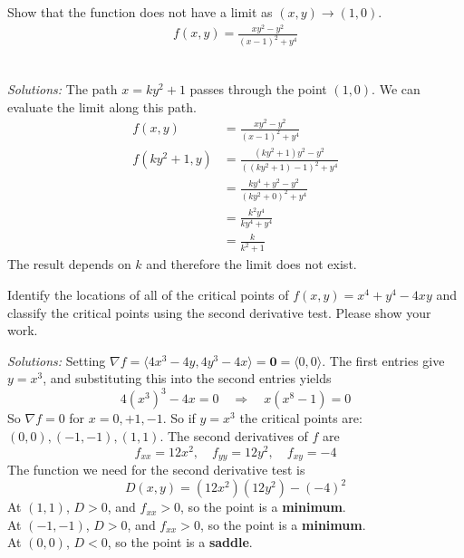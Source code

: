 
\ifnum {}
\question[4] Show that the function does not have a limit as $(x,y) \to (1,0)$.  
    \begin{align}
        f(x,y) = \frac{xy^2 - y^2}{(x-1)^2 +y^4}
    \end{align}
\ifnum {} {\color{DarkBlue} \\ \textit{Solutions:} The path $x=ky^2+1$ passes through the point $(1,0)$. We can evaluate the limit along this path. 
    \begin{align}
        f(x,y) &= \frac{xy^2 - y^2}{(x-1)^2 +y^4} \\
        f(ky^2+1,y) 
        &= \frac{(ky^2+1)y^2 - y^2}{((ky^2+1)-1)^2 +y^4} \\
        &= \frac{ky^4+ y^2 - y^2}{(ky^2 + 0 )^2 +y^4} \\
        &= \frac{k^2y^4}{ky^4 +y^4} \\
        &= \frac{k}{k^2+1}
    \end{align}
    The result depends on $k$ and therefore the limit does not exist. 

    } 
   \else
      
   \fi
    
\fi











\ifnum {}
\question[6] Identify the locations of all of the critical points of $f(x,y) = x^4+y^4-4xy$ and classify the critical points using the second derivative test. Please show your work. 

\ifnum {} {\color{DarkBlue} \textit{Solutions:} Setting $\nabla f = \langle 4x^3-4y, 4y^3-4x\rangle = \mathbf 0 = \langle 0,0\rangle$. The first entries give $y=x^3$, and substituting this into the second entries yields $$4(x^3)^3 -4x = 0 \quad \Rightarrow \quad  x(x^8-1) = 0$$
So $\nabla f =0$ for $x = 0, + 1, -1$. So if $y=x^3$ the critical points are: $(0,0), (-1,-1), (1,1)$. The second derivatives of $f$ are
$$f_{xx} = 12x^2, \quad f_{yy} = 12y^2, \quad f_{xy} = -4$$
The function we need for the second derivative test is 
$$D(x,y) = (12x^2)(12y^2) - (-4)^2$$
At $(1,1)$, $D>0$, and $f_{xx}>0$, so the point is a \textbf{minimum}.  \\
At $(-1,-1)$, $D>0$, and $f_{xx}>0$, so the point is a \textbf{minimum}.  \\
At $(0,0)$, $D<0$, so the point is a \textbf{saddle}.  
} 
\else
\fi    
\fi



